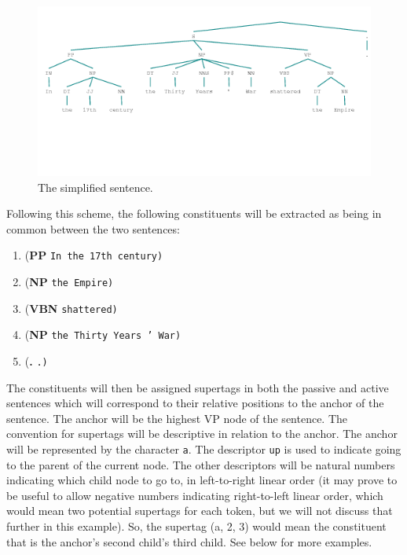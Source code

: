 \documentclass{article}
\begin{document}
\begin{figure}
\begin{center}
\includegraphics[scale=.65]{tree1}
\caption{The simplified sentence.}
\end{center}
\end{figure}

Following this scheme, the following constituents will be extracted as being in common between the two sentences:

\begin{enumerate}
\item (\textbf{PP} \texttt{In the 17th century)}
\item (\textbf{NP} \texttt{the Empire)}
\item (\textbf{VBN} \texttt{shattered)}
\item (\textbf{NP} \texttt{the Thirty Years ' War)}
\item (\textbf{.} \texttt{.)}
\end{enumerate}

The constituents will then be assigned supertags in both the passive and active sentences which will correspond to their relative positions to the anchor of the sentence. The anchor will be the highest VP node of the sentence. The convention for supertags will be descriptive in relation to the anchor. The anchor will be represented by the character \texttt{a}. The descriptor \texttt{up} is used to indicate going to the parent of the current node. The other descriptors will be natural numbers indicating which child node to go to, in left-to-right linear order (it may prove to be useful to allow negative numbers indicating right-to-left linear order, which would mean two potential supertags for each token, but we will not discuss that further in this example). So, the supertag (a, 2, 3) would mean the constituent that is the anchor's second child's third child. See below for more examples.	
\end{document}

